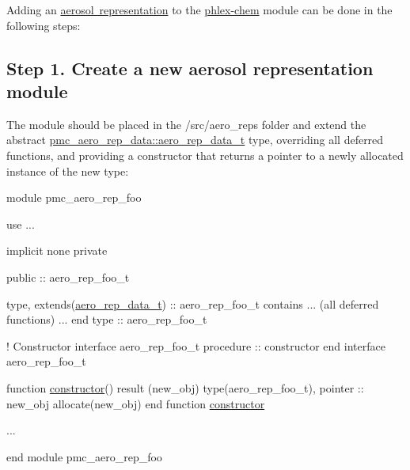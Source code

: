 Adding an \mbox{\hyperlink{phlex_aero_rep}{aerosol representation}} to the \mbox{\hyperlink{phlex_chem}{phlex-\/chem}} module can be done in the following steps\+:

\subsection*{Step 1. Create a new aerosol representation module}

The module should be placed in the {\ttfamily /src/aero\+\_\+reps} folder and extend the abstract {\ttfamily \mbox{\hyperlink{structpmc__aero__rep__data_1_1aero__rep__data__t}{pmc\+\_\+aero\+\_\+rep\+\_\+data\+::aero\+\_\+rep\+\_\+data\+\_\+t}}} type, overriding all deferred functions, and providing a constructor that returns a pointer to a newly allocated instance of the new type\+:


\begin{DoxyCode}
\textcolor{keyword}{module} pmc\_aero\_rep\_foo

  \textcolor{keywordtype}{use }...

  \textcolor{keywordtype}{implicit none}
  \textcolor{keywordtype}{private}

  \textcolor{keywordtype}{public} :: aero\_rep\_foo\_t

  \textcolor{keyword}{type}, \textcolor{keyword}{extends}(\mbox{\hyperlink{structpmc__aero__rep__data_1_1aero__rep__data__t}{aero\_rep\_data\_t}}) :: aero\_rep\_foo\_t
  \textcolor{keyword}{contains}
    ... (all \textcolor{keywordtype}{deferred} functions) ...
\textcolor{keyword}{  end type }:: aero\_rep\_foo\_t
  
  \textcolor{comment}{! Constructor}
  \textcolor{keyword}{interface} aero\_rep\_foo\_t
    \textcolor{keywordtype}{procedure} :: constructor
\textcolor{keyword}{  end interface }aero\_rep\_foo\_t

\textcolor{keyword}{  function }\mbox{\hyperlink{namespacepmc__aero__phase__data_ae2a9e6bfb1747e2ace93ab3fadd55530}{constructor}}() \textcolor{keyword}{result} (new\_obj)
    \textcolor{keywordtype}{type}(aero\_rep\_foo\_t), \textcolor{keywordtype}{pointer} :: new\_obj
    \textcolor{keyword}{allocate}(new\_obj)
\textcolor{keyword}{  end function }\mbox{\hyperlink{namespacepmc__aero__phase__data_ae2a9e6bfb1747e2ace93ab3fadd55530}{constructor}}

  ...

\textcolor{keyword}{end module }pmc\_aero\_rep\_foo
\end{DoxyCode}


